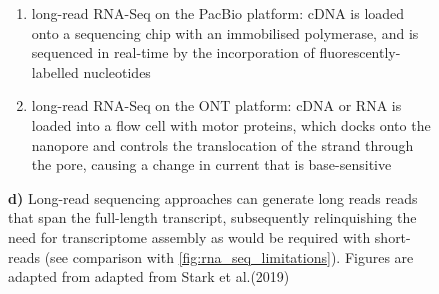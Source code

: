 \begin{figure}[htp]
{\begin{enumerate}[label=\textbf{\alph*)}]
			\item long-read RNA-Seq on the PacBio platform: cDNA is loaded onto a sequencing chip with an immobilised polymerase, and is sequenced in real-time by the incorporation of fluorescently-labelled nucleotides
			\item long-read RNA-Seq on the ONT platform: cDNA or RNA is loaded into a flow cell with motor proteins, which docks onto the nanopore and controls the translocation of the strand through the pore, causing a change in current that is base-sensitive
			\\
		\end{enumerate}
		\textbf{d)} Long-read sequencing approaches can generate long reads reads that span the full-length transcript, subsequently relinquishing the need for transcriptome assembly as would be required with short-reads (see comparison with \cref{fig:rna_seq_limitations}). \newline
		Figures are adapted from adapted from Stark et al.(2019) \cite{Stark2019}
	} 
	\label{fig:longread_benefits}
\end{figure}	

